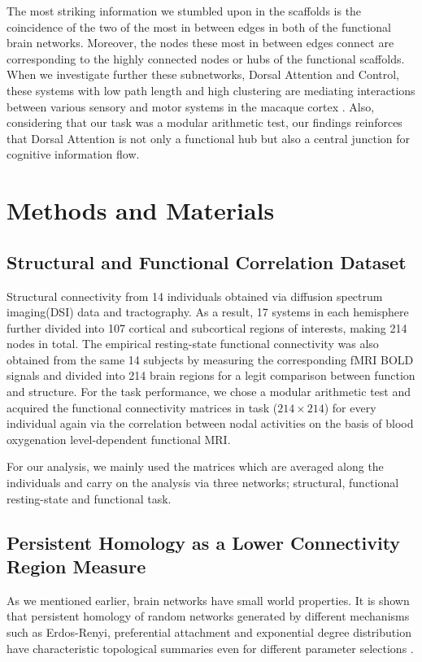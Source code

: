 \documentclass[9pt,twocolumn,twoside,lineno]{pnas-new}
\begin{document}
The most striking information we stumbled upon in the scaffolds is the coincidence of the two of the most in between edges in both of the functional brain networks. Moreover, the nodes these most in between edges connect are corresponding to the highly connected nodes or hubs of the functional scaffolds. When we investigate further these subnetworks, Dorsal Attention and Control, these systems with low path length and high clustering are mediating interactions between various sensory and motor systems in the macaque cortex \cite{smallworld1,smallworld3}. Also, considering that our task was a modular arithmetic test, our findings reinforces that Dorsal Attention is not only a functional hub but also a central junction for cognitive information flow.



\section*{Methods and Materials}

\subsection{Structural and Functional Correlation Dataset} Structural connectivity from 14 individuals obtained via diffusion spectrum imaging(DSI) data and tractography. As a result, 17 systems in each hemisphere further divided into 107 cortical and subcortical regions of interests, making 214 nodes in total.
The empirical resting-state functional connectivity was also obtained from the same 14 subjects by measuring the corresponding fMRI BOLD signals and divided into 214 brain regions for a legit comparison between function and structure. For the task performance, we chose a modular arithmetic test and acquired the functional connectivity matrices in task ($214\times 214$) for every individual again via the correlation between nodal activities on the basis of blood oxygenation level-dependent functional MRI. 

For our analysis, we mainly used the matrices which are averaged along the individuals and carry on the analysis via three networks; structural, functional resting-state and functional task.



\subsection{Persistent Homology as a Lower Connectivity Region Measure}
As we mentioned earlier, brain networks have small world properties. It is shown that persistent homology of random networks generated by different mechanisms such as Erdos-Renyi, preferential attachment and exponential degree distribution have characteristic topological summaries even for different parameter selections \cite{pershomcompnetw}.
\end{document}
